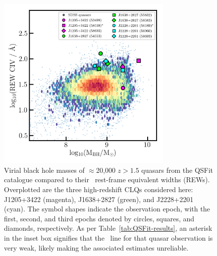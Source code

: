 \documentclass[fleqn,usenatbib]{mnras}
\begin{document}
\begin{figure}
  \centering
  \includegraphics[width=8.5cm, trim=0.2cm 0.2cm 0.0cm 0.2cm, clip]
  {figures/CIV_CLQs_MBHvsREW_20200710.png}
   \vspace{-12pt}
   \caption[]{
     Virial black hole masses of 
     $\approx$20,000 $z>1.5$ quasars from the QSFit catalogue
     \citep{Calderone2017} compared to their \civ\ rest-frame equivalent
     widths (REWs).  Overplotted are the three high-redshift CLQs
     considered here: J1205+3422 (magenta), J1638+2827 (green), and
     J2228+2201 (cyan).  The symbol shapes indicate the observation epoch,
     with the first, second, and third epochs denoted by circles, squares,
     and diamonds, respectively. As per Table~\ref{tab:QSFit-results}, an
     asterisk in the inset box signifies that the \civ\ line for that
     quasar observation is very weak, likely making the associated
     estimates unreliable.}
   \label{fig:CIV_MBHvsREW}
\end{figure}
\end{document}
